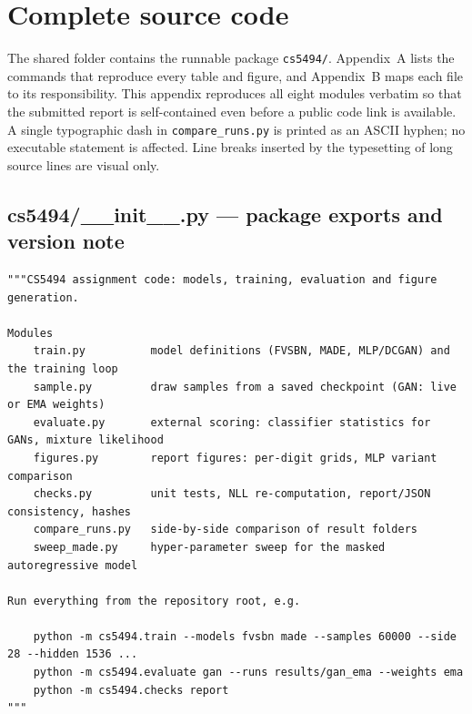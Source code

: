 
\newpage
\section{Complete source code}
\label{app:code}

The shared folder contains the runnable package \texttt{cs5494/}. Appendix~A lists the
commands that reproduce every table and figure, and Appendix~B maps each file to its
responsibility. This appendix reproduces all eight modules verbatim so that the submitted
report is self-contained even before a public code link is available. A single typographic
dash in \texttt{compare\_runs.py} is printed as an ASCII hyphen; no executable statement is
affected. Line breaks inserted by the typesetting of long source lines are visual only.

\subsection*{cs5494/\_\_init\_\_.py --- package exports and version note}
\begin{lstlisting}
"""CS5494 assignment code: models, training, evaluation and figure generation.

Modules
    train.py          model definitions (FVSBN, MADE, MLP/DCGAN) and the training loop
    sample.py         draw samples from a saved checkpoint (GAN: live or EMA weights)
    evaluate.py       external scoring: classifier statistics for GANs, mixture likelihood
    figures.py        report figures: per-digit grids, MLP variant comparison
    checks.py         unit tests, NLL re-computation, report/JSON consistency, hashes
    compare_runs.py   side-by-side comparison of result folders
    sweep_made.py     hyper-parameter sweep for the masked autoregressive model

Run everything from the repository root, e.g.

    python -m cs5494.train --models fvsbn made --samples 60000 --side 28 --hidden 1536 ...
    python -m cs5494.evaluate gan --runs results/gan_ema --weights ema
    python -m cs5494.checks report
"""
\end{lstlisting}

